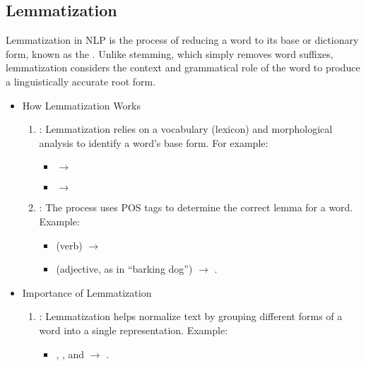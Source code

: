 \documentclass[letterpaper,11pt,english]{sphinxmanual}
\begin{document}
\subsection{Lemmatization}
\label{\detokenize{prelim:lemmatization}}
\sphinxAtStartPar
Lemmatization in NLP is the process of reducing a word to its base or dictionary form, known as
the . Unlike stemming, which simply removes word suffixes, lemmatization considers
the context and grammatical role of the word to produce a linguistically accurate root form.
\begin{itemize}
\item {} 
\sphinxAtStartPar
How Lemmatization Works
\begin{enumerate}
%
\item {} 
\sphinxAtStartPar
{}:
\sphinxhyphen{} Lemmatization relies on a vocabulary (lexicon) and morphological analysis to identify a word’s base form.
\sphinxhyphen{} For example:
\begin{itemize}
\item {} 
\sphinxAtStartPar
{} \(\rightarrow\) 

\item {} 
\sphinxAtStartPar
{} \(\rightarrow\) 

\end{itemize}

\item {} 
\sphinxAtStartPar
{}:
\sphinxhyphen{} The process uses POS tags to determine the correct lemma for a word.
\sphinxhyphen{} Example:
\begin{itemize}
\item {} 
\sphinxAtStartPar
{} (verb) \(\rightarrow\) 

\item {} 
\sphinxAtStartPar
{} (adjective, as in “barking dog”) \(\rightarrow\) .

\end{itemize}

\end{enumerate}

\item {} 
\sphinxAtStartPar
Importance of Lemmatization
\begin{enumerate}
%
\item {} 
\sphinxAtStartPar
{}:
\sphinxhyphen{} Lemmatization helps normalize text by grouping different forms of a word into a single representation.
\sphinxhyphen{} Example:
\begin{itemize}
\item {} 
\sphinxAtStartPar
{}, , and  \(\rightarrow\) .


\end{itemize}
\end{enumerate}
\end{itemize}
\end{document}
